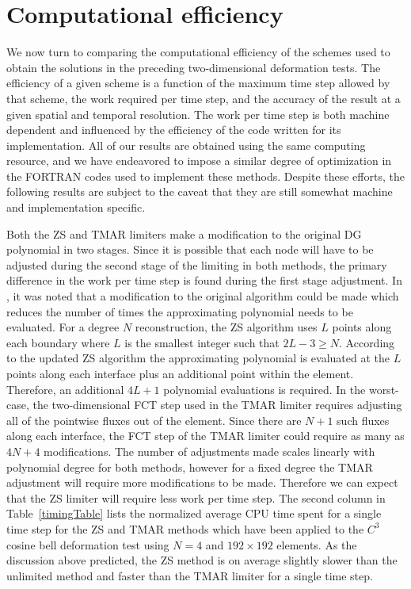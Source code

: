 \documentclass{ametsoc}
\begin{document}
\section{Computational efficiency} \label{sec:Efficiency}

We now turn to comparing the computational efficiency of the schemes used to obtain the solutions in the preceding two-dimensional deformation tests. The efficiency of a given scheme is a function of the maximum time step allowed by that scheme, the work required per time step, and the accuracy of the result at a given spatial and temporal resolution.  The work per time step is both machine dependent and influenced by the efficiency of the code written for its implementation. All of our results are obtained using the same computing resource, and we have endeavored to impose a similar degree of optimization in the FORTRAN codes used to implement these methods. Despite these efforts, the following results are subject to the caveat that they are still somewhat machine and implementation specific.

Both the ZS and TMAR limiters make a modification to the original DG polynomial in two stages. Since it is possible that each node will have to be adjusted during the second stage of the limiting in both methods, the primary difference in the work per time step is found during the first stage adjustment. In \citep{Zhang:2011aa}, it was noted that a modification to the original algorithm could be made which reduces the number of times the approximating polynomial needs to be evaluated. For a degree $N$ reconstruction, the ZS algorithm uses $L$ points along each boundary where $L$ is the smallest integer such that $2L-3 \geq N$. According to the updated ZS algorithm the approximating polynomial is evaluated at the $L$ points along each interface plus an additional point within the element. Therefore, an additional $4L+1$ polynomial evaluations is required. In the worst-case, the two-dimensional FCT step used in the TMAR limiter requires adjusting all of the pointwise fluxes out of the element. Since there are $N+1$ such fluxes along each interface, the FCT step of the TMAR limiter could require as many as $4N+4$ modifications. The number of adjustments made scales linearly with polynomial degree for both methods, however for a fixed degree the TMAR adjustment will require more modifications to be made. Therefore we can expect that the ZS limiter will require less work per time step. The second column in Table~\ref{timingTable} lists the normalized average CPU time spent for a single time step for the ZS and TMAR methods which have been applied to the $C^3$ cosine bell deformation test using $N=4$ and $192\times192$ elements. As the discussion above predicted, the ZS method is on average slightly slower than the unlimited method and faster than the TMAR limiter for a single time step. 
\end{document}
